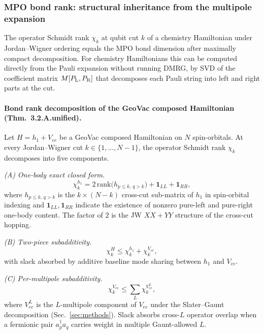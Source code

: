 \documentclass[aps,pra,twocolumn,superscriptaddress,longbibliography]{revtex4-2}
\begin{document}
\subsubsection{MPO bond rank: structural inheritance from the
multipole expansion}
\label{sec:mpo_bond_rank}

The operator Schmidt rank $\chi_k$ at qubit cut $k$ of a chemistry
Hamiltonian under Jordan--Wigner ordering equals the MPO bond
dimension after maximally compact decomposition.  For chemistry
Hamiltonians this can be computed directly from the Pauli expansion
without running DMRG, by SVD of the coefficient matrix
$M[P_{\rm L}, P_{\rm R}]$ that decomposes each Pauli string into left
and right parts at the cut.

\paragraph*{Bond rank decomposition of the GeoVac composed
Hamiltonian (Thm.~3.2.A.unified).}
\label{thm:mpo_bond_rank}
Let $H = h_1 + V_{ee}$ be a GeoVac composed Hamiltonian on $N$
spin-orbitals.  At every Jordan--Wigner cut $k \in \{1, \ldots, N-1\}$,
the operator Schmidt rank $\chi_k$ decomposes into five components.

\emph{(A) One-body exact closed form.}
\begin{equation}
  \chi_k^{h_1}  =  2\,\mathrm{rank}\big(h_{p\le k,\,q > k}\big)
  + \mathbf{1}_{LL} + \mathbf{1}_{RR},
\label{eq:chi_h1_closed}
\end{equation}
where $h_{p\le k,\,q>k}$ is the $k \times (N-k)$ cross-cut sub-matrix
of $h_1$ in spin-orbital indexing and $\mathbf{1}_{LL}, \mathbf{1}_{RR}$
indicate the existence of nonzero pure-left and pure-right one-body
content.  The factor of $2$ is the JW $XX + YY$ structure of the
cross-cut hopping.

\emph{(B) Two-piece subadditivity.}
\begin{equation}
  \chi_k^H  \le  \chi_k^{h_1} + \chi_k^{V_{ee}},
\label{eq:chi_subadd}
\end{equation}
with slack absorbed by additive baseline mode sharing between $h_1$
and $V_{ee}$.

\emph{(C) Per-multipole subadditivity.}
\begin{equation}
  \chi_k^{V_{ee}}  \le  \sum_L \chi_k^{V_{ee}^L},
\label{eq:chi_perL_subadd}
\end{equation}
where $V_{ee}^L$ is the $L$-multipole component of $V_{ee}$ under the
Slater--Gaunt decomposition (Sec.~\ref{sec:methods}).  Slack absorbs
cross-$L$ operator overlap when a fermionic pair $a^\dagger_p a_q$
carries weight in multiple Gaunt-allowed $L$.
\end{document}
